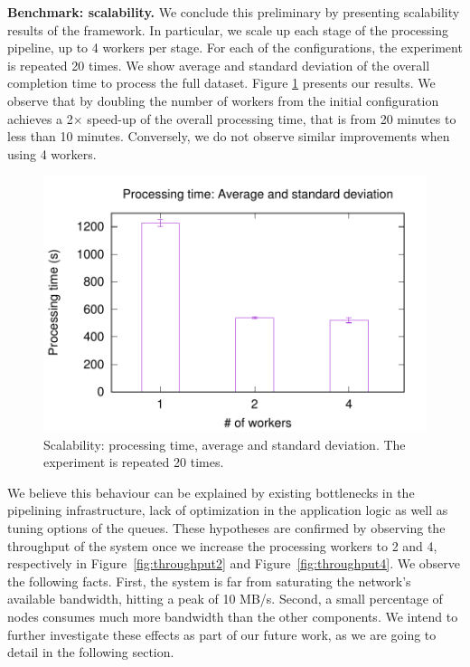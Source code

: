 \textbf{Benchmark: scalability.} We conclude this preliminary by presenting scalability results of the \SYS framework.
In particular, we scale up each stage of the processing pipeline, up to 4 workers per stage.
For each of the configurations, the experiment is repeated 20 times.
We show average and standard deviation of the overall completion time to process the full dataset.
Figure \ref{fig:scalability} presents our results.
We observe that by doubling the number of workers from the initial configuration achieves a 2$\times$ speed-up of the overall processing time, that is from 20 minutes to less than 10 minutes.
Conversely, we do not observe similar improvements when using 4 workers.

\begin{figure}[t!]
  \centering
  \includegraphics[scale=0.5]{images/avg_stdev_4_streams}
  \caption{Scalability: processing time, average and standard deviation. The experiment is repeated 20 times.}
  \label{fig:scalability}
\end{figure}

We believe this behaviour can be explained by existing bottlenecks in the pipelining infrastructure, lack of optimization in the application logic as well as tuning options of the \zmq queues.
These hypotheses are confirmed by observing the throughput of the system once we increase the processing workers to 2 and 4, respectively in Figure~\ref{fig:throughput2} and Figure~\ref{fig:throughput4}.
We observe the following facts.
First, the system is far from saturating the network's available bandwidth, hitting a peak of 10 MB/s.
Second, a small percentage of nodes consumes much more bandwidth than the other components.
We intend to further investigate these effects as part of our future work, as we are going to detail in the following section.

